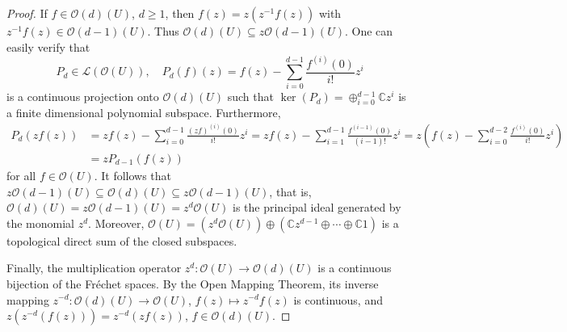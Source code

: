 \documentclass[12pt,reqno]{amsart}%
\theoremstyle{plain}
\numberwithin{theorem}{section} \numberwithin{equation}{section}
\numberwithin{lemma}{section}
\numberwithin{remark}{section}
\numberwithin{example}{section}
\numberwithin{proposition}{section}
\numberwithin{definition}{section}
\numberwithin{corollary}{section}
\begin{document}
\begin{proof}
If $f\in\mathcal{O}\left(  d\right)  \left(  U\right)  $, $d\geq1$, then
$f\left(  z\right)  =z\left(  z^{-1}f\left(  z\right)  \right)  $ with
$z^{-1}f\left(  z\right)  \in\mathcal{O}\left(  d-1\right)  \left(  U\right)
$. Thus $\mathcal{O}\left(  d\right)  \left(  U\right)  \subseteq
z\mathcal{O}\left(  d-1\right)  \left(  U\right)  $. One can easily verify
that
\[
P_{d}\in\mathcal{L}\left(  \mathcal{O}\left(  U\right)  \right)  ,\quad
P_{d}\left(  f\right)  \left(  z\right)  =f\left(  z\right)  -\sum_{i=0}%
^{d-1}\frac{f^{\left(  i\right)  }\left(  0\right)  }{i!}z^{i}%
\]
is a continuous projection onto $\mathcal{O}\left(  d\right)  \left(
U\right)  $ such that $\ker\left(  P_{d}\right)  =\oplus_{i=0}^{d-1}%
\mathbb{C}z^{i}$ is a finite dimensional polynomial subspace. Furthermore,
\begin{align*}
P_{d}\left(  zf\left(  z\right)  \right)   &  =zf\left(  z\right)  -\sum
_{i=0}^{d-1}\frac{\left(  zf\right)  ^{\left(  i\right)  }\left(  0\right)
}{i!}z^{i}=zf\left(  z\right)  -\sum_{i=1}^{d-1}\frac{f^{\left(  i-1\right)
}\left(  0\right)  }{\left(  i-1\right)  !}z^{i}=z\left(  f\left(  z\right)
-\sum_{i=0}^{d-2}\frac{f^{\left(  i\right)  }\left(  0\right)  }{i!}%
z^{i}\right) \\
&  =zP_{d-1}\left(  f\left(  z\right)  \right)
\end{align*}
for all $f\in\mathcal{O}\left(  U\right)  $. It follows that $z\mathcal{O}%
\left(  d-1\right)  \left(  U\right)  \subseteq\mathcal{O}\left(  d\right)
\left(  U\right)  \subseteq z\mathcal{O}\left(  d-1\right)  \left(  U\right)
$, that is, $\mathcal{O}\left(  d\right)  \left(  U\right)  =z\mathcal{O}%
\left(  d-1\right)  \left(  U\right)  =z^{d}\mathcal{O}\left(  U\right)  $ is
the principal ideal generated by the monomial $z^{d}$. Moreover,
$\mathcal{O}\left(  U\right)  =\left(  z^{d}\mathcal{O}\left(  U\right)
\right)  \oplus\left(  \mathbb{C}z^{d-1}\oplus\cdots\oplus\mathbb{C}1\right)
$ is a topological direct sum of the closed subspaces.

Finally, the multiplication operator $z^{d}:\mathcal{O}\left(  U\right)
\rightarrow\mathcal{O}\left(  d\right)  \left(  U\right)  $ is a continuous
bijection of the Fr\'{e}chet spaces. By the Open Mapping Theorem, its inverse
mapping $z^{-d}:\mathcal{O}\left(  d\right)  \left(  U\right)  \rightarrow
\mathcal{O}\left(  U\right)  $, $f\left(  z\right)  \mapsto z^{-d}f\left(
z\right)  $ is continuous, and $z\left(  z^{-d}\left(  f\left(  z\right)
\right)  \right)  =z^{-d}\left(  zf\left(  z\right)  \right)  $,
$f\in\mathcal{O}\left(  d\right)  \left(  U\right)  $.
\end{proof}
\end{document}
